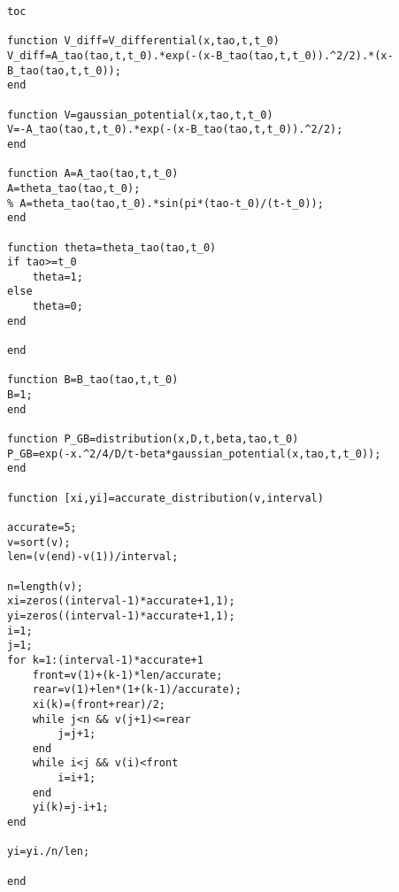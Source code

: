 \begin{lstlisting}
toc

function V_diff=V_differential(x,tao,t,t_0)
V_diff=A_tao(tao,t,t_0).*exp(-(x-B_tao(tao,t,t_0)).^2/2).*(x-B_tao(tao,t,t_0));
end

function V=gaussian_potential(x,tao,t,t_0)
V=-A_tao(tao,t,t_0).*exp(-(x-B_tao(tao,t,t_0)).^2/2);
end

function A=A_tao(tao,t,t_0)
A=theta_tao(tao,t_0);
% A=theta_tao(tao,t_0).*sin(pi*(tao-t_0)/(t-t_0));
end

function theta=theta_tao(tao,t_0)
if tao>=t_0
    theta=1;
else
    theta=0;
end

end

function B=B_tao(tao,t,t_0)
B=1;
end

function P_GB=distribution(x,D,t,beta,tao,t_0)
P_GB=exp(-x.^2/4/D/t-beta*gaussian_potential(x,tao,t,t_0));
end

function [xi,yi]=accurate_distribution(v,interval)

accurate=5;
v=sort(v);
len=(v(end)-v(1))/interval;

n=length(v);
xi=zeros((interval-1)*accurate+1,1);
yi=zeros((interval-1)*accurate+1,1);
i=1;
j=1;
for k=1:(interval-1)*accurate+1
    front=v(1)+(k-1)*len/accurate;
    rear=v(1)+len*(1+(k-1)/accurate);
    xi(k)=(front+rear)/2;
    while j<n && v(j+1)<=rear
        j=j+1;
    end
    while i<j && v(i)<front
        i=i+1;
    end
    yi(k)=j-i+1;
end

yi=yi./n/len;

end
\end{lstlisting}